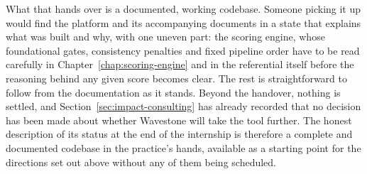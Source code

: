 What that hands over is a documented, working codebase. Someone picking it up would find the platform and its accompanying documents in a state that explains what was built and why, with one uneven part: the scoring engine, whose foundational gates, consistency penalties and fixed pipeline order have to be read carefully in Chapter~\ref{chap:scoring-engine} and in the referential itself before the reasoning behind any given score becomes clear. The rest is straightforward to follow from the documentation as it stands. Beyond the handover, nothing is settled, and Section~\ref{sec:impact-consulting} has already recorded that no decision has been made about whether Wavestone will take the tool further. The honest description of its status at the end of the internship is therefore a complete and documented codebase in the practice's hands, available as a starting point for the directions set out above without any of them being scheduled.